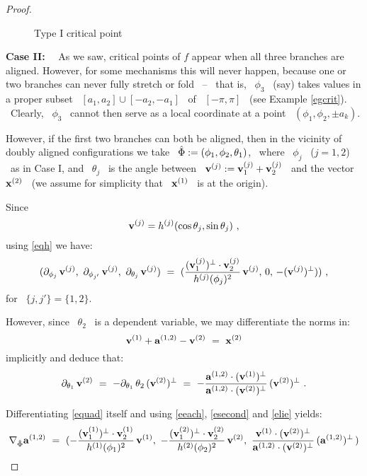 \begin{proof}
\begin{figure}[htbp]
\begin{center}
\epsfysize=5cm %
\leavevmode {} \caption{Type I
critical point}\label{fcaseI}
\end{center}
\end{figure}

\noindent\textbf{Case II:} \ \ As we saw, critical points of $f$
appear when all three branches are aligned. However, for some
mechanisms this will never happen, because one or two
branches can never fully stretch or fold \ -- \
that is, \ $\phi_{3}$ \ (say) takes values in a proper subset \
$[a_{1},a_{2}]\cup[-a_{2},-a_{1}]$ \ of \ $[-\pi,\pi]$ \ (see
Example \ref{egcrit}). \ Clearly, \ $\phi_{3}$ \ cannot then serve as
a local coordinate at a point \ $(\phi_{1},\phi_{2},\pm a_{k})$.

However, if the first two branches can both be aligned, then in the vicinity
of doubly aligned configurations we take \
$\hat{\Phi}:=(\phi_{1},\phi_{2},\theta_{1})$, \ where \ $\phi_{j}$ \ ($j=1,2$)  \
as in Case I, and \ $\theta_{j}$ \ is the angle between  \
$\mathbf{v}\sp{({j})}:=\mathbf{v}\sp{({j})}_{1}+\mathbf{v}\sp{({j})}_{2}$ \ and the vector \
$\mathbf{x}\sp{({2})}$ \ (we assume for simplicity that \ $\mathbf{x}\sp{({1})}$ \ is at the origin).

Since
%
\begin{equation}\label{evj}
%
\vj{j}=\hj{j}(\cos\theta_{j},\sin\theta_{j})~,
%
\end{equation}
%
using \eqref{eqh} we have:
%
\begin{equation}\label{eeach}
%
(\dif{\vj{j}}{\phi_{j}},~\dif{\vj{j}}{\phi_{j'}},~\dif{\vj{j}}{\theta_{j}})~=~
(\frac{\vpp{j}}{\hj{j}(\phi_{j})^{2}}\,\vj{j},\,
0,\,-\vp{j}))~,
%
\end{equation}
%
for \ $\{j,j'\}=\{1,2\}$.

However, since \ $\theta_{2}$ \ is a dependent variable, we may
differentiate the norms in:
%
\begin{equation}\label{equad}
%
\vj{1}+\aj{1,2}-\vj{2}~=~\xj{2}
%
\end{equation}
%
implicitly and deduce that:
%
\begin{equation}\label{esecond}
%
\dif{\vj{2}}{\theta_{1}}~=~
-\dif{\theta_{2}}{\theta_{1}}\,\vp{2}~=~
-\frac{\aj{1,2}\cdot\vp{1}}{\aj{1,2}\cdot\vp{2}}\,\vp{2}~.
%
\end{equation}

Differentiating \eqref{equad} itself and using
\eqref{eeach}, \eqref{esecond} and \eqref{elie} yields:
%
\begin{equation}\label{ethird}
%
\nabla_{\hP}\aj{1,2}~=~
(-\frac{\vpp{1}}{\hj{1}(\phi_{1})^{2}}\,\vj{1},~
-\frac{\vpp{2}}{\hj{2}(\phi_{2})^{2}}\,\vj{2},~
\frac{\vj{1}\cdot\vp{2}}{\aj{1,2}\cdot\vp{2}}\,(\aj{1,2})^{\perp}\,)
%
\end{equation}


\end{proof}
